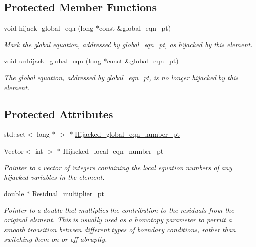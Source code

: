 \subsection*{Protected Member Functions}
\begin{DoxyCompactItemize}
\item 
void \hyperlink{classoomph_1_1HijackedElementBase_ac518df71f978c2b80cd25a1283353ab5}{hijack\+\_\+global\+\_\+eqn} (long $\ast$const \&global\+\_\+eqn\+\_\+pt)
\begin{DoxyCompactList}\small\item\em Mark the global equation, addressed by global\+\_\+eqn\+\_\+pt, as hijacked by this element. \end{DoxyCompactList}\item 
void \hyperlink{classoomph_1_1HijackedElementBase_aa94e2c93374151302879645f4c354c3f}{unhijack\+\_\+global\+\_\+eqn} (long $\ast$const \&global\+\_\+eqn\+\_\+pt)
\begin{DoxyCompactList}\small\item\em The global equation, addressed by global\+\_\+eqn\+\_\+pt, is no longer hijacked by this element. \end{DoxyCompactList}\end{DoxyCompactItemize}
\subsection*{Protected Attributes}
\begin{DoxyCompactItemize}
\item 
std\+::set$<$ long $\ast$ $>$ $\ast$ \hyperlink{classoomph_1_1HijackedElementBase_a9c3a9a4e39ee5e3af0f5594c31f532c5}{Hijacked\+\_\+global\+\_\+eqn\+\_\+number\+\_\+pt}
\item 
\hyperlink{classoomph_1_1Vector}{Vector}$<$ int $>$ $\ast$ \hyperlink{classoomph_1_1HijackedElementBase_ae604da2f744f328f3866a2cefa3aa80c}{Hijacked\+\_\+local\+\_\+eqn\+\_\+number\+\_\+pt}
\begin{DoxyCompactList}\small\item\em Pointer to a vector of integers containing the local equation numbers of any hijacked variables in the element. \end{DoxyCompactList}\item 
double $\ast$ \hyperlink{classoomph_1_1HijackedElementBase_a283509b7af09479e7a1cb8c0e05a8c16}{Residual\+\_\+multiplier\+\_\+pt}
\begin{DoxyCompactList}\small\item\em Pointer to a double that multiplies the contribution to the residuals from the original element. This is usually used as a homotopy parameter to permit a smooth transition between different types of boundary conditions, rather than switching them on or off abruptly. \end{DoxyCompactList}\end{DoxyCompactItemize}

